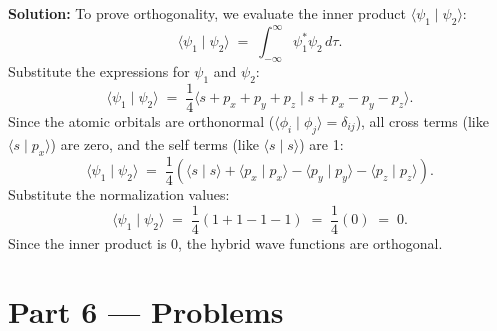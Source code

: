 \documentclass[12pt, a4paper]{book}
\begin{document}
\begin{problembox}
\begin{enumerate}[label=\textbf{E\arabic*.}]
        \textbf{Solution:}
        To prove orthogonality, we evaluate the inner product $\langle \psi_1 \mid \psi_2 \rangle$:
        \[
          \langle \psi_1 \mid \psi_2 \rangle \;=\; \int_{-\infty}^\infty \psi_1^* \psi_2 \, d\tau.
        \]
        Substitute the expressions for $\psi_1$ and $\psi_2$:
        \[
          \langle \psi_1 \mid \psi_2 \rangle \;=\; \frac{1}{4} \langle s + p_x + p_y + p_z \mid s + p_x - p_y - p_z \rangle.
        \]
        Since the atomic orbitals are orthonormal ($\langle \phi_i \mid \phi_j \rangle = \delta_{ij}$), all cross terms (like $\langle s \mid p_x \rangle$) are zero, and the self terms (like $\langle s \mid s \rangle$) are 1:
        \[
          \langle \psi_1 \mid \psi_2 \rangle \;=\; \frac{1}{4} \left( \langle s \mid s \rangle + \langle p_x \mid p_x \rangle - \langle p_y \mid p_y \rangle - \langle p_z \mid p_z \rangle \right).
        \]
        Substitute the normalization values:
        \[
          \langle \psi_1 \mid \psi_2 \rangle \;=\; \frac{1}{4} \left( 1 + 1 - 1 - 1 \right) \;=\; \frac{1}{4} (0) \;=\; 0.
        \]
        Since the inner product is 0, the hybrid wave functions are orthogonal.
\end{enumerate}
\end{problembox}

\newpage

\section{Part 6 --- Problems}
\end{document}
